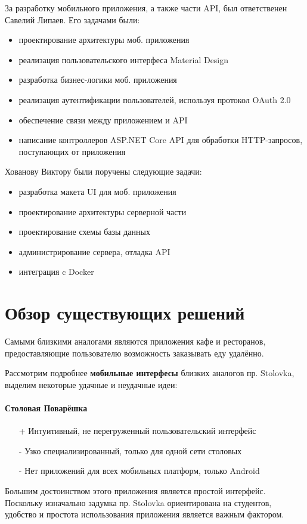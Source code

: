\documentclass[14pt]{matmex-diploma-custom}
\begin{document}
	За разработку мобильного приложения, а также части API, был ответственен Савелий Липаев. Его задачами были:
	\begin{itemize}
	    \item проектирование архитектуры моб. приложения
	    \item реализация пользовательского интерфеса Material Design
	    \item разработка бизнес-логики моб. приложения
	    \item реализация аутентификации пользователей, используя протокол OAuth 2.0
	    \item обеспечение связи между приложением и API
	    \item написание контроллеров ASP.NET Core API для обработки HTTP-запросов, поступающих от приложения
	\end{itemize}
	Хованову Виктору были поручены следующие задачи:
	\begin{itemize}
	    \item разработка макета UI для моб. приложения
	    \item проектирование архитектуры серверной части
	    \item проектирование схемы базы данных
	    \item администрирование сервера, отладка API
	    \item интеграция c Docker
	\end{itemize}

\section{Обзор существующих решений}
	Самыми близкими аналогами являются приложения кафе и ресторанов,
	предоставляющие пользователю возможность заказывать еду удалённо.

	Рассмотрим подробнее {\bf мобильные интерфесы} близких аналогов пр. Stolovka, выделим некоторые удачные и неудачные идеи:
	\paragraph{Столовая Поварёшка}
	    \begin{itemize}
	        \item[+] Интуитивный, не перегруженный пользовательский интерфейс
	        \item[-] Узко специализированный, только для одной сети столовых
	        \item[-] Нет приложений для всех мобильных платформ, только Android
	    \end{itemize}
	    Большим достоинством этого приложения является простой интерфейс.
	    Поскольку изначально задумка пр. Stolovka ориентирована на студентов, удобство и простота использования приложения является важным фактором.
\end{document}
